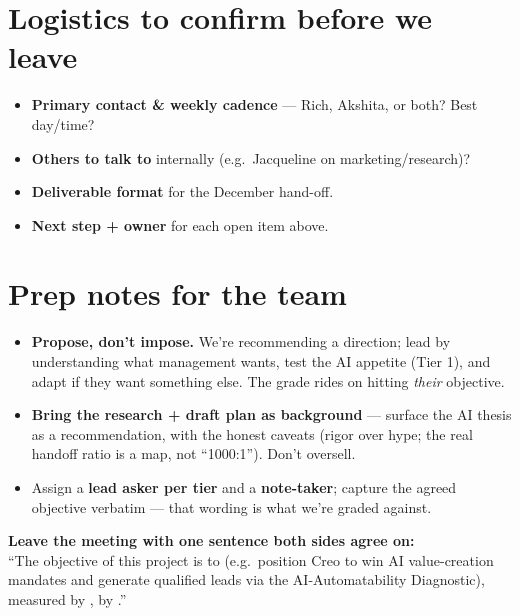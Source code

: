 \documentclass[11pt]{article}
\begin{document}
\section{Logistics to confirm before we leave}
\begin{itemize}
  \item \textbf{Primary contact \& weekly cadence} --- Rich, Akshita, or both? Best day/time?
  \item \textbf{Others to talk to} internally (e.g.\ Jacqueline on marketing/research)?
  \item \textbf{Deliverable format} for the December hand-off.
  \item \textbf{Next step + owner} for each open item above.
\end{itemize}

\section{Prep notes for the team}
\begin{itemize}
  \item \textbf{Propose, don't impose.} We're recommending a direction; lead by understanding
  what management wants, test the AI appetite (Tier 1), and adapt if they want something else.
  The grade rides on hitting \emph{their} objective.
  \item \textbf{Bring the research + draft plan as background} --- surface the AI thesis as a
  recommendation, with the honest caveats (rigor over hype; the real handoff ratio is a map, not
  ``1000:1''). Don't oversell.
  \item Assign a \textbf{lead asker per tier} and a \textbf{note-taker}; capture the agreed
  objective verbatim --- that wording is what we're graded against.
\end{itemize}

\begin{callout}
\textbf{Leave the meeting with one sentence both sides agree on:}\\[3pt]
``The objective of this project is to \underline{\hspace{4.5cm}} (e.g.\ position Creo to win AI
value-creation mandates and generate qualified leads via the AI-Automatability Diagnostic),
measured by \underline{\hspace{3cm}}, by \underline{\hspace{2.5cm}}.''
\end{callout}
\end{document}

